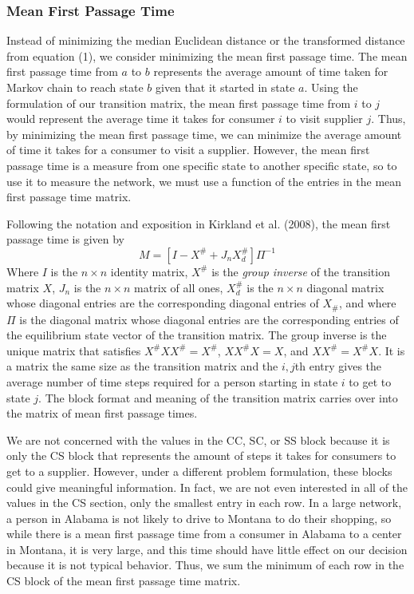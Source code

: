 \documentclass[twoside,twocolumn]{article}
\begin{document}
\subsubsection{Mean First Passage Time}
Instead of minimizing the median Euclidean distance or the transformed distance from equation (1), we consider minimizing the mean first passage time.
The mean first passage time from $a$ to $b$ represents the average amount of time taken for Markov chain to reach state $b$ given that it started in state $a$.
Using the formulation of our transition matrix, the mean first passage time from $i$ to $j$ would represent the average time it takes for consumer $i$ to visit supplier $j$.
Thus, by minimizing the mean first passage time, we can minimize the average amount of time it takes for a consumer to visit a supplier.
However, the mean first passage time is a measure from one specific state to another specific state, so to use it to measure the network, we must use a function of the entries in the mean first passage time matrix.

Following the notation and exposition in Kirkland et al. (2008), the mean first passage time is given by
$$ M = [I - X^{\#} + J_{n}X_{d}^{\#}]\Pi^{-1}$$
Where $I$ is the $n \times n$ identity matrix, $X^{\#}$ is the {\em group inverse} of the transition matrix $X$, $J_{n}$ is the $n \times n$ matrix of all ones, $X_{d}^{\#}$ is the $n \times n$ diagonal matrix whose diagonal entries are the corresponding diagonal entries of $X_{\#}$, and where $\Pi$ is the diagonal matrix whose diagonal entries are the corresponding entries of the equilibrium state vector of the transition matrix.%
The group inverse is the unique matrix that satisfies $X^{\#}XX^{\#} = X^{\#}$, $XX^{\#}X = X$, and $XX^{\#} = X^{\#}X$.
It is a matrix the same size as the transition matrix and the $i,j$th entry gives the average number of time steps required for a person starting in state $i$ to get to state $j$.
The block format and meaning of the transition matrix carries over into the matrix of mean first passage times.

We are not concerned with the values in the CC, SC, or SS block because it is only the CS block that represents the amount of steps it takes for consumers to get to a supplier.
However, under a different problem formulation, these blocks could give meaningful information.
In fact, we are not even interested in all of the values in the CS section, only the smallest entry in each row.
In a large network, a person in Alabama is not likely to drive to Montana to do their shopping, so while there is a mean first passage time from a consumer in Alabama to a center in Montana, it is very large, and this time should have little effect on our decision because it is not typical behavior.
Thus, we sum the minimum of each row in the CS block of the mean first passage time matrix.
\end{document}
